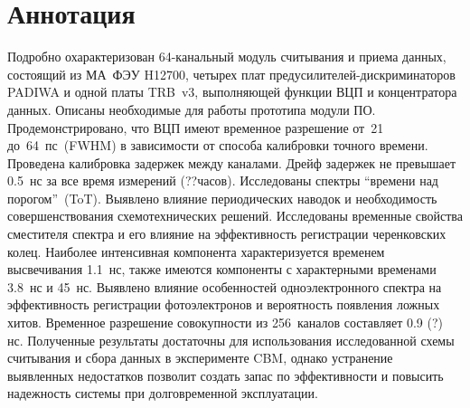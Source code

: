 \section*{Аннотация}\label{sec:secAbstract}


Подробно охарактеризован 64-канальный модуль считывания и приема данных, состоящий из МА~ФЭУ H12700, четырех плат предусилителей-дискриминаторов PADIWA и одной платы TRB~v3, выполняющей функции ВЦП и концентратора данных. Описаны необходимые для работы прототипа модули ПО. Продемонстрировано, что ВЦП имеют временное разрешение от~21 до~64~пс~(FWHM) в зависимости от способа калибровки точного времени. Проведена калибровка задержек между каналами. Дрейф задержек не превышает 0.5~нс за все время измерений (??часов). Исследованы спектры ``времени над порогом''~(ToT).
Выявлено влияние периодических наводок и необходимость совершенствования схемотехнических решений. Исследованы временные свойства сместителя спектра и его влияние на эффективность регистрации черенковских колец. Наиболее интенсивная компонента характеризуется временем высвечивания 1.1~нс, также имеются компоненты с характерными временами 3.8~нс и 45~нс. Выявлено влияние особенностей одноэлектронного спектра на эффективность регистрации фотоэлектронов и вероятность появления ложных хитов. Временное разрешение совокупности из 256~каналов составляет 0.9 (?) нс. Полученные результаты достаточны для использования исследованной схемы считывания и сбора данных в эксперименте CBM, однако устранение выявленных недостатков позволит создать запас по эффективности и повысить надежность системы при долговременной эксплуатации.

